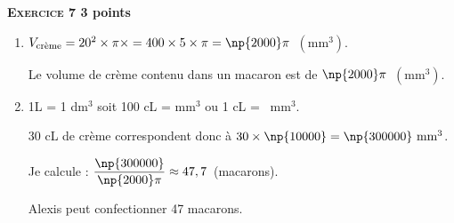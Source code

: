 \textbf{\textsc{Exercice 7} \hfill 3 points}

\medskip

\begin{enumerate}
\item $V_{\text{crème}} = 20^2 \times \pi \times = 400 \times  5 \times \pi = \np{2000}\pi$~$\left(\text{mm}^3\right)$.

Le volume de crème contenu dans un macaron est de $\np{2000}\pi$~$\left(\text{mm}^3\right)$.
\item 1L = 1 dm$^3$ soit 100 cL =  mm$^3$ ou 1 cL = ~mm$^3$.

30 cL de crème correspondent  donc à $30 \times\np{10000} = \np{300000}~\text{mm}^3$.

Je calcule : $\dfrac{\np{300000}}{\np{2000}\pi} \approx 47,7$~(macarons).

Alexis peut confectionner 47 macarons.
\end{enumerate}
\vspace{0,5cm}

